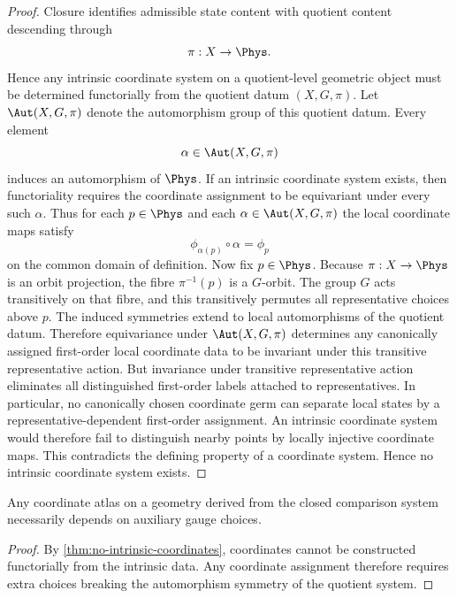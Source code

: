 \begin{proof}
	Closure identifies admissible state content with quotient content
	descending through
	\[
		\pi:X\to\Phys.
	\]
	Hence any intrinsic coordinate system on a quotient-level geometric
	object must be determined functorially from the quotient datum
	\((X,G,\pi)\).
	Let \(\Aut(X,G,\pi)\) denote the automorphism group of this quotient
	datum.  Every element
	\[
		\alpha\in\Aut(X,G,\pi)
	\]
	induces an automorphism of \(\Phys\).  If an intrinsic coordinate system
	exists, then functoriality requires the coordinate assignment to be
	equivariant under every such \(\alpha\).  Thus for each \(p\in\Phys\)
	and each \(\alpha\in\Aut(X,G,\pi)\) the local coordinate maps satisfy
	\[
		\phi_{\alpha(p)}\circ \alpha = \phi_p
	\]
	on the common domain of definition.
	Now fix \(p\in\Phys\).  Because \(\pi:X\to\Phys\) is an orbit
	projection, the fibre \(\pi^{-1}(p)\) is a \(G\)-orbit.  The group \(G\)
	acts transitively on that fibre, and this transitively permutes all
	representative choices above \(p\).  The induced symmetries extend to
	local automorphisms of the quotient datum.  Therefore equivariance under
	\(\Aut(X,G,\pi)\) determines any canonically assigned first-order local
	coordinate data to be invariant under this transitive representative
	action.
	But invariance under transitive representative action eliminates all
	distinguished first-order labels attached to representatives.  In
	particular, no canonically chosen coordinate germ can separate local
	states by a representative-dependent first-order assignment.  An
	intrinsic coordinate system would therefore fail to distinguish nearby
	points by locally injective coordinate maps.
	This contradicts the defining property of a coordinate system.
	Hence no intrinsic coordinate system exists.
\end{proof}
\begin{corollary}
	Any coordinate atlas on a geometry derived from the closed comparison
	system necessarily depends on auxiliary gauge choices.
\end{corollary}
\begin{proof}
	By \cref{thm:no-intrinsic-coordinates}, coordinates cannot be
	constructed functorially from the intrinsic data.  Any coordinate
	assignment therefore requires extra choices breaking the automorphism
	symmetry of the quotient system.
\end{proof}
